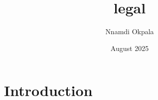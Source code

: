 \documentclass{article}
\title{legal}
\author{Nnamdi Okpala}
\date{August 2025}
\begin{document}
\maketitle

\section{Introduction}
\end{document}
